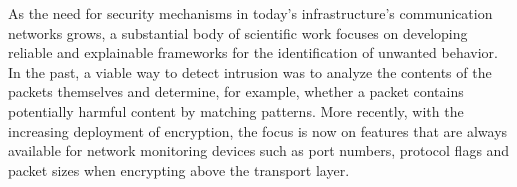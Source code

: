\documentclass[conference]{IEEEtran}
\begin{document}
As the need for security mechanisms in today's infrastructure's communication networks grows, a substantial body of scientific work focuses on developing reliable and explainable frameworks for the identification of unwanted behavior. In the past, a viable way to detect intrusion was to analyze the contents of the packets themselves and determine, for example, whether a packet contains potentially harmful content by matching patterns. More recently, with the increasing deployment of encryption, the focus is now on features that are always available for network monitoring devices such as port numbers, protocol flags and packet sizes when encrypting above the transport layer.

\end{document}
